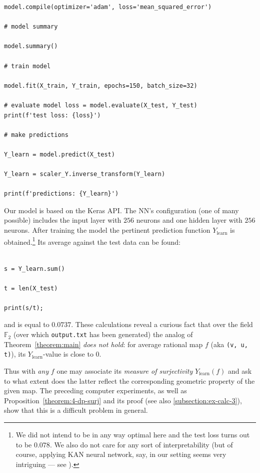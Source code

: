 \documentclass[14pt]{amsart}
\theoremstyle{definition}
\theoremstyle{remark}
\begin{document}
{\begin{lstlisting}
model.compile(optimizer='adam', loss='mean_squared_error')

# model summary

model.summary()

# train model

model.fit(X_train, Y_train, epochs=150, batch_size=32)

# evaluate model loss = model.evaluate(X_test, Y_test)
print(f'test loss: {loss}')

# make predictions

Y_learn = model.predict(X_test)

Y_learn = scaler_Y.inverse_transform(Y_learn)

print(f'predictions: {Y_learn}')

\end{lstlisting}
}

\medskip

Our model is based on the Keras API. The NN's configuration (one
of many possible) includes the input layer with $256$ neurons and
one hidden layer with $256$ neurons. After training the model the
pertinent prediction function $Y_{\text{learn}}$ is
obtained.\footnote{We did not intend to be in any way optimal here
and the test loss turns out to be $0.078$. We also do not care for
any sort of interpretability (but of course, applying KAN neural
network, say, in our setting seems very intriguing --- see
\cite{KAN}).} Its average against the test data can be found:

\begin{lstlisting}

s = Y_learn.sum()

t = len(X_test)

print(s/t);

\end{lstlisting}
and is equal to $0.0737$. These calculations reveal a curious fact
that over the field $\mathbb{F}_2$ (over which \texttt{output.txt}
has been generated) the analog of Theorem~\ref{theorem:main}
\emph{does not hold}: for average rational map $f$ (aka
\texttt{(v, u, t)}), its $Y_{\text{learn}}$-value is close to $0$.

Thus with \emph{any} $f$ one may associate its \emph{measure of
surjectivity} $Y_{\text{learn}}(f)$ and ask to what extent does
the latter reflect the corresponding geometric property of the
given map. The preceding computer experiments, as well as
Proposition~\ref{theorem:4-dp-surj} and its proof (see also
{\ref{subsection:ex-calc-3}}), show that this is a difficult
problem in general.
\end{document}
